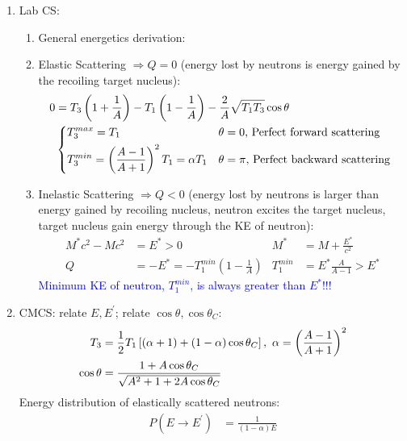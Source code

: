 \documentclass{school-22.101-notes}
\begin{document}
\begin{enumerate}
\item Lab CS: 
\begin{enumerate}
    \item General energetics derivation: 
    \item Elastic Scattering $\Rightarrow Q=0$ (energy lost by neutrons is energy gained by the recoiling target nucleus):
        \begin{align}
        0 &= T_3 \left( 1 + \frac{1}{A} \right)  - T_1 \left( 1 - \frac{1}{A} \right) - \frac{2}{A} \sqrt{ T_1 T_3} \cos \theta \\
        &\begin{dcases*}
        T_3^{max} = T_1 &  $\theta = 0$,  Perfect forward scattering \\
        T_3^{min} = \left( \frac{A-1}{A+1} \right)^2 T_1 = \alpha T_1 & $\theta = \pi$, Perfect backward scattering 
        \end{dcases*}
        \end{align}
    \item Inelastic Scattering $\Rightarrow Q < 0$ (energy lost by neutrons is larger than energy gained by recoiling nucleus, neutron excites the target nucleus, target nucleus gain energy through the KE of neutron):
\begin{align}
M^* c^2 - M c^2 &= E^* > 0  & M^* &= M + \frac{E^*}{c^2} \label{M*} \\
Q &= - E^* = -T_1^{min} \left( 1 - \frac{1}{A} \right) & T_1^{min} &= E^* \frac{A}{A-1} > E^* 
\end{align}
\textcolor{blue}{Minimum KE of neutron, $T_1^{min}$, is always greater than $E^*$!!!}
\end{enumerate}
%
\item CMCS: relate $E, E^{\prime}$; relate $\cos \theta, \cos \theta_C$:
    \begin{align}
     T_3 &= \frac{1}{2} T_1 \left[ (\alpha+1 ) + (1-\alpha) \cos \theta_C \right], \mbox{ } \alpha = \left( \frac{A-1}{A+1} \right)^2 \\
    \cos \theta &= \frac{1 + A \cos \theta_C}{\sqrt{A^2 + 1 + 2A \cos \theta_C}} 
    \end{align}
Energy distribution of elastically scattered neutrons:
    \begin{align}
    P(E \to E^{\prime}) &= \frac{1}{(1-\alpha)E} \\

\end{align}
\end{enumerate}
\end{document}
